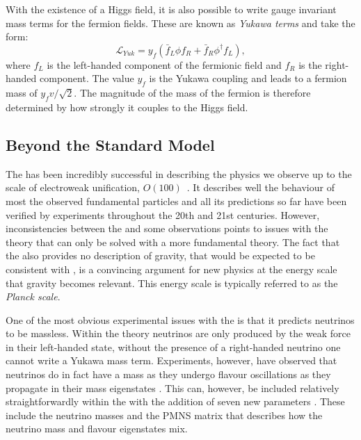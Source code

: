 With the existence of a Higgs field, it is also possible to write
gauge invariant mass terms for the fermion fields. These are known as
\emph{Yukawa terms} and take the form:
\begin{equation}
  \mathcal{L}_{Yuk}=y_{f}\left(\bar{f}_{L}\phi f_{R}+\bar{f}_{R}\phi^{\dag}f_{L}\right),
\end{equation}
where $f_L$ is the left-handed component of the fermionic field and
$f_R$ is the right-handed component. The value $y_f$ is the Yukawa
coupling and leads to a fermion mass of $y_fv/\sqrt{2}$. The magnitude
of the mass of the fermion is therefore determined by how strongly it
couples to the Higgs field.

\subsection{Beyond the Standard Model}
\label{sec:bsm}

The \SM has been incredibly successful in describing the physics we
observe up to the scale of electroweak unification, $O(100)$~\gev. It
describes well the behaviour of most the observed fundamental
particles and all its predictions so far have been verified by
experiments throughout the 20th and 21st centuries. However,
inconsistencies between the \SM and some observations points to issues
with the theory that can only be solved with a more fundamental \BSM
theory. The fact that the \SM also provides no description of gravity,
that would be expected to be consistent with \GR, is a convincing
argument for new physics at the energy scale that gravity becomes
relevant. This energy scale is typically referred to as the
\emph{Planck scale}.

One of the most obvious experimental issues with the \SM is that it
predicts neutrinos to be massless. Within the theory neutrinos are
only produced by the weak force in their left-handed state, without
the presence of a right-handed neutrino one cannot write a Yukawa mass
term.  Experiments, however, have observed that neutrinos do in fact
have a mass as they undergo flavour oscillations as they propagate in
their mass eigenstates \cite{PhysRevLett.87.071301,Fukuda:1998mi}.
This can, however, be included relatively straightforwardly within the
\SM with the addition of seven new parameters
\cite{doi:10.1143/PTP.28.870}.  These include the neutrino masses and
the \ac{PMNS} matrix that describes how the neutrino mass and flavour
eigenstates mix.


